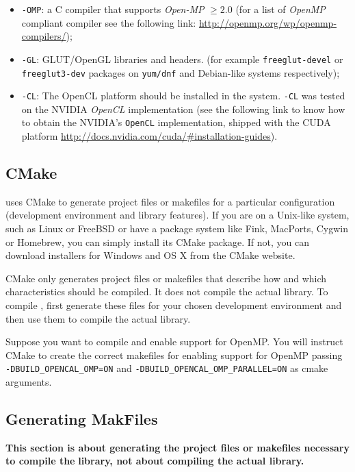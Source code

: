 \begin{itemize}
	\item \texttt{\ocal-OMP}: a C compiler that supports \emph{Open-MP} $\geq 2.0$ (for a list of \emph{OpenMP} compliant compiler see the following link: \url{http://openmp.org/wp/openmp-compilers/});
	\item  \texttt{\ocal-GL}: GLUT/OpenGL libraries and headers. (for example \texttt{freeglut-devel} or \texttt{freeglut3-dev} packages on \texttt{yum/dnf} and Debian-like systems respectively);
	\item \texttt{\ocal-CL}: The OpenCL platform should be installed in the system. \texttt{\ocal-CL} was tested on the NVIDIA \emph{OpenCL} implementation (see the following link to know how to obtain the NVIDIA's \texttt{OpenCL} implementation, shipped with the CUDA platform \url{http://docs.nvidia.com/cuda/#installation-guides}).
\end{itemize}



\subsection{CMake}
\texttt{\ocal} uses CMake to generate project files or makefiles for a particular configuration (development environment and library features). If you are on a Unix-like system, such as Linux or FreeBSD or have a package system like Fink, MacPorts, Cygwin or Homebrew, you can simply install its CMake package. If not, you can download installers for Windows and OS X from the CMake website.

CMake only generates project files or makefiles that describe how and which characteristics should be compiled. It does not compile the actual \ocal library. To compile \ocal, first generate these files for your chosen development environment and then use them to compile the actual \texttt{\ocal} library.

Suppose you want to compile \texttt{\ocal} and enable support for OpenMP. You will instruct CMake to create the correct makefiles for enabling support for OpenMP passing \texttt{-DBUILD\_OPENCAL\_OMP=ON} and \texttt{-DBUILD\_OPENCAL\_OMP\_PARALLEL=ON} as cmake arguments. 

\subsection{Generating MakFiles}
\textbf{This section is about generating the project files or makefiles necessary to compile the}  \texttt{\ocal} \textbf{library, not about compiling the actual library.}

